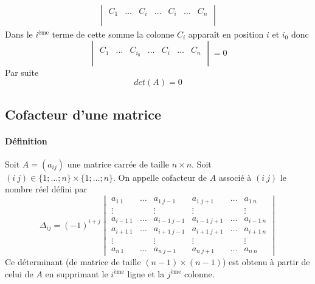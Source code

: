 \begin{itemize}
\begin{eqnarray*}
\begin{vmatrix}
          C_1 & \ldots & C_{i} & \ldots & C_i & \ldots & C_n 
        \\ \\ \end{vmatrix}
    \end{eqnarray*}
    Dans le $i^{\text{ème}}$ terme de cette somme la colonne $C_i$ apparaît en position $i$ et $i_0$ donc
    $$\begin{vmatrix} \\ C_1 & \ldots & C_{i_0} & \ldots & C_i & \ldots & C_n \\ \\ \end{vmatrix} = 0$$
    Par suite
    $$det(A) = 0$$
\end{itemize}

%
\subsection{Cofacteur d'une matrice}
%
\paragraph{Définition} Soit $A = (a_{ij})$ une matrice carrée de taille $n\times n$. Soit $(i ~ j) \in \{1; \ldots; n\} \times \{1; \ldots; n \}$. On appelle cofacteur de $A$ associé à $(i ~ j)$ le nombre réel défini par
$$\Delta_{ij} = (-1)^{i+j} \begin{vmatrix}
  a_{1 ~ 1} & \ldots & a_{1 ~ j-1} & a_{1 ~ j+1} & \ldots & a_{1 ~ n} \\
  \vdots &  & \vdots & \vdots &  & \vdots \\
  a_{i-1 ~ 1} & \ldots & a_{i-1 ~ j-1} & a_{i-1 ~ j+1} & \ldots & a_{i-1 ~ n} \\
  a_{i+1 ~ 1} & \ldots & a_{i+1 ~ j-1} & a_{i+1 ~ j+1} & \ldots & a_{i+1 ~ n} \\
  \vdots &  & \vdots & \vdots &  & \vdots \\
  a_{n ~ 1} & \ldots & a_{n ~ j-1} & a_{n ~ j+1} & \ldots & a_{n ~ n}
\end{vmatrix}$$
Ce déterminant (de matrice de taille $(n-1) \times (n-1)$) est obtenu à partir de celui de $A$ en supprimant le $i^{\text{ème}}$ ligne et la $j^{\text{ème}}$ colonne.

